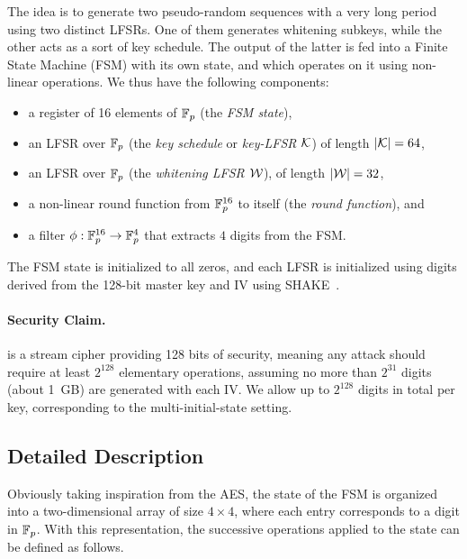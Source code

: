 The idea is to generate two pseudo-random sequences with a very long
period using two distinct LFSRs. One of them generates whitening
subkeys, while the other acts as a sort of key schedule. The output of
the latter is fed into a Finite State Machine (FSM) with its own
state, and which operates on it using non-linear operations. We thus
have the following components:
\begin{itemize}
\item a register of 16 elements of $\mathbb{F}_{p}$ (the \emph{FSM state}),
\item an LFSR over $\mathbb{F}_{p}$ (the \emph{key schedule} or \emph{key-LFSR} $\mathcal{K}$) of length $|\mathcal{K}| = 64$, 
\item an LFSR over $\mathbb{F}_{p}$ (the \emph{whitening LFSR} $\mathcal{W}$), of length $|\mathcal{W}| = 32$,
\item a non-linear round function from $\mathbb{F}_{p}^{16}$ to itself (the \emph{round function}), and
\item a filter $\phi : \mathbb{F}_{p}^{16} \to \mathbb{F}_{p}^4$ that extracts $4$ digits from the FSM.
\end{itemize}



The FSM state is initialized to all zeros, and each LFSR is initialized using digits derived from the 128-bit master key and IV using SHAKE~\cite{sha-3}. 


\paragraph{Security Claim.} \coolName{} is a stream cipher providing 128 bits of security, meaning any attack should require at least $2^{128}$ elementary operations, assuming no more than $2^{31}$ digits (about 1~GB) are generated with each IV.  We allow up to $2^{128}$ digits in total per key, corresponding to the multi-initial-state setting.





\subsection{Detailed Description}
\label{sec:sepc-details}

Obviously taking inspiration from the AES, the state of the FSM is organized into a two-dimensional array of size $4\times 4$, where each entry corresponds to a digit in $\mathbb{F}_p$. With this representation, the successive operations applied to the state can be defined as follows.

